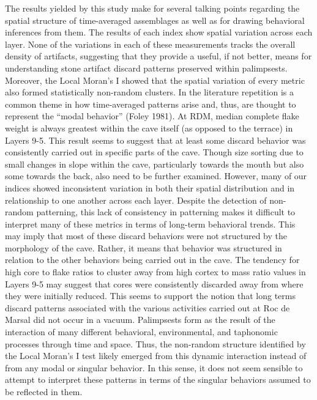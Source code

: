 \documentclass[smallextended]{svjour3}       %
\begin{document}
The results yielded by this study make for several talking points
regarding the spatial structure of time-averaged assemblages as well as
for drawing behavioral inferences from them. The results of each index
show spatial variation across each layer. None of the variations in each
of these measurements tracks the overall density of artifacts,
suggesting that they provide a useful, if not better, means for
understanding stone artifact discard patterns preserved within
palimpsests. Moreover, the Local Moran's I showed that the spatial
variation of every metric also formed statistically non-random clusters.
In the literature repetition is a common theme in how time-averaged
patterns arise and, thus, are thought to represent the ``modal
behavior'' (Foley 1981). At RDM, median complete flake weight is always
greatest within the cave itself (as opposed to the terrace) in Layers
9-5. This result seems to suggest that at least some discard behavior
was consistently carried out in specific parts of the cave. Though size
sorting due to small changes in slope within the cave, particularly
towards the mouth but also some towards the back, also need to be
further examined. However, many of our indices showed inconsistent
variation in both their spatial distribution and in relationship to one
another across each layer. Despite the detection of non-random
patterning, this lack of consistency in patterning makes it difficult to
interpret many of these metrics in terms of long-term behavioral trends.
This may imply that most of these discard behaviors were not structured
by the morphology of the cave. Rather, it means that behavior was
structured in relation to the other behaviors being carried out in the
cave. The tendency for high core to flake ratios to cluster away from
high cortex to mass ratio values in Layers 9-5 may suggest that cores
were consistently discarded away from where they were initially reduced.
This seems to support the notion that long terms discard patterns
associated with the various activities carried out at Roc de Marsal did
not occur in a vacuum. Palimpsests form as the result of the interaction
of many different behavioral, environmental, and taphonomic processes
through time and space. Thus, the non-random structure identified by the
Local Moran's I test likely emerged from this dynamic interaction
instead of from any modal or singular behavior. In this sense, it does
not seem sensible to attempt to interpret these patterns in terms of the
singular behaviors assumed to be reflected in them.
\end{document}
